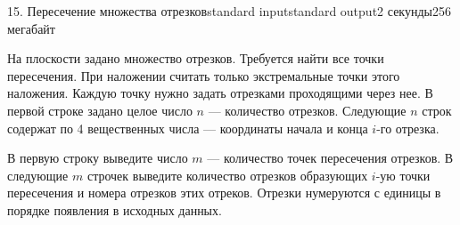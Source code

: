 \begin{problem}{15. Пересечение множества отрезков}{standard input}{standard output}{2 секунды}{256 мегабайт}

На плоскости задано множество отрезков. Требуется найти все точки пересечения.
При наложении считать только экстремальные точки этого наложения.
Каждую точку нужно задать отрезками проходящими через нее.
\InputFile
В первой строке задано целое число $n$ --- количество отрезков.
Следующие $n$ строк содержат по 4 вещественных числа --- координаты начала и конца $i$-го отрезка.

\OutputFile
В первую строку выведите число $m$ --- количество точек пересечения отрезков.
В следующие $m$ строчек выведите количество отрезков образующих $i$-ую точки пересечения и номера отрезков этих отреков. Отрезки нумеруются с единицы в порядке появления в исходных данных.  
\Examples

\begin{example}%
%
\end{example}

\end{problem}